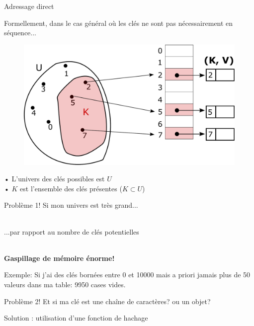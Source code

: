 \documentclass[12pt,a4paper]{beamer}
\newcommand{\hl}[1]{\textcolor{blueemph}{#1}}
\begin{document}
\begin{frame}{Adressage direct}
\begin{block}{}
Formellement, dans le cas général où les clés ne sont pas nécessairement en séquence...
\end{block}


\begin{figure}
\includegraphics[scale=0.28]{figs/ht_cle_unseq}
\end{figure}
\footnotesize • L'univers des clés possibles est $U$ \\
\footnotesize • $K$ est l'ensemble des clés présentes ($K \subset U$)
\end{frame}






\begin{frame}{Problème 1!}
\pause
Si mon univers est très grand...\\
~\\
\pause

...par rapport au nombre de clés potentielles\\
\pause
~\\
\begin{center}
 \hl{\textbf{Gaspillage de mémoire énorme!}}
 \end{center}
 
 Exemple: Si j'ai des clés bornées entre 0 et 10000 mais a priori jamais plus de 50 valeurs dans ma table: 9950 cases vides.

\end{frame}
\begin{frame}{Problème 2!}
 Et si ma clé est une chaîne de caractères? ou un objet?

\pause
Solution : utilisation d'une \hl{fonction de hachage}
\end{frame}
\end{document}
